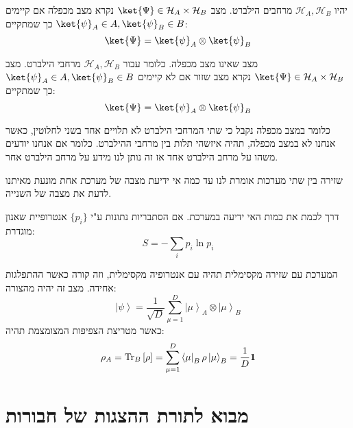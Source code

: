 \documentclass{tstextbook}
\begin{document}
\begin{definition}
יהיו \(\mathcal{H}_{A},\mathcal{H}_{B}\) מרחבים הילברט. מצב \(\ket{\Psi}\in \mathcal{H}_{A}\times \mathcal{H}_{B}\) נקרא מצב מכפלה אם קיימים \(\ket{\psi}_{A}\in A,\ket{\psi}_{B}\in B\) כך שמתקיים:
$$\ket{\Psi} =\ket{\psi} _{A}\otimes \ket{\psi} _{B}$$

\end{definition}
\begin{definition}
מצב שאינו מצב מכפלה. כלומר עבור \(\mathcal{H}_{A},\mathcal{H}_{B}\) מרחבי הילברט. מצב \(\ket{\Psi}\in \mathcal{H}_{A}\times \mathcal{H}_{B}\) נקרא מצב שזור אם לא קיימים \(\ket{\psi}_{A}\in A,\ket{\psi}_{B}\in B\) כך שמתקיים:
$$\ket{\Psi} =\ket{\psi} _{A}\otimes \ket{\psi} _{B}$$

\end{definition}
כלומר במצב מכפלה נקבל כי שתי המרחבי הילברט לא תלויים אחד בשני לחלוטין, כאשר אנחנו לא במצב מכפלה, תהיה איזשהי תלות בין מרחבי ההילברט. כלומר אם אנחנו יודעים משהו על מרחב הילברט אחד אז זה נותן לנו מידע על מרחב הילברט אחר.

\begin{definition}[שזירה]
שזירה בין שתי מערכות אומרת לנו עד כמה אי ידיעת מצבה של מערכת אחת מונעת מאיתנו לדעת את מצבה של השנייה.

\end{definition}
\begin{definition}
דרך לכמת את כמות האי ידיעה במערכת. אם הסתבריות נתונות ע"י \(\{ p_{i} \}\) אנטרופיית שאנון מוגדרת:
$$S=-\sum_{i}p_{i}\ln p_{i}$$

\end{definition}
\begin{proposition}
המערכת עם שזירה מקסימלית תהיה עם אנטרופיה מקסימלית, וזה קורה כאשר ההתפלגות אחידה. מצב זה יהיה מהצורה:
$$\left|\psi\right\rangle={\frac{1}{\sqrt{D}}}{\sum_{\mu=1}^{D}{\left|\mu\right\rangle}_{A}\otimes{\left|\mu\right\rangle}_{B}}$$
כאשר מטריצת הצפיפות המצומצמת תהיה:
$$\rho_{A}=\mathrm{Tr}_{B}\left[\rho\right]=\sum_{\mu=1}^{D}\left\langle\mu\right|_{B}\rho\left|\mu\right\rangle_{B}=\frac{1}{D}{\bf1}$$

\end{proposition}

\section{מבוא לתורת ההצגות של חבורות}
\end{document}
